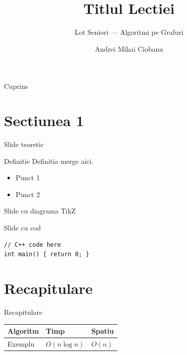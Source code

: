 \documentclass[10pt]{beamer}
\title{Titlul Lectiei}
\subtitle{Lot Seniori --- Algoritmi pe Grafuri}
\author{Andrei Mihai Ciobanu}
\institute{Algolymp Summer School}
\date{}
\begin{document}
\begin{frame}
  \titlepage
\end{frame}

\begin{frame}{Cuprins}
  \tableofcontents
\end{frame}

\section{Sectiunea 1}

\begin{frame}{Slide teoretic}
  \begin{block}{Definitie}
    Definitia merge aici.
  \end{block}
  \begin{itemize}
    \item Punct 1
    \item Punct 2
  \end{itemize}
\end{frame}

\begin{frame}{Slide cu diagrama TikZ}
  \begin{center}
  \end{center}
\end{frame}

\begin{frame}[fragile]{Slide cu cod}
  \begin{lstlisting}
// C++ code here
int main() { return 0; }
  \end{lstlisting}
\end{frame}

\section{Recapitulare}

\begin{frame}{Recapitulare}
  \begin{center}
  \begin{tabular}{lll}
    \toprule
    Algoritm & Timp & Spatiu \\
    \midrule
    Exemplu & $O(n \log n)$ & $O(n)$ \\
    \bottomrule
  \end{tabular}
  \end{center}
\end{frame}
\end{document}
